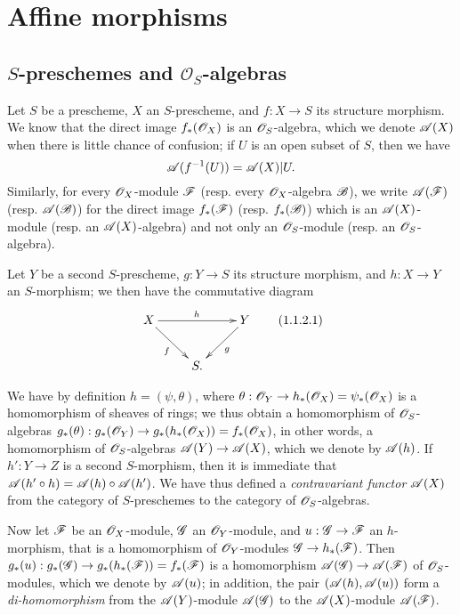 \section{Affine morphisms}
\label{section:II.1}

\subsection{$S$-preschemes and $\mathcal{O}_S$-algebras}
\label{subsection:II.1.1}

\begin{env}[1.1.1]
\label{II.1.1.1}
Let $S$ be a prescheme, $X$ an $S$-prescheme, and $f:X\to S$ its structure morphism.
We know  that the direct image $f_*(\mathscr{O}_X)$ is an $\mathscr{O}_S$-algebra, which we
denote $\mathscr{A}(X)$ when there is little chance of confusion; if $U$ is an open subset of $S$, then we have
\[
  \mathscr{A}(f^{-1}(U))=\mathscr{A}(X)|U.
\]
Similarly, for every $\mathscr{O}_X$-module $\mathscr{F}$ (resp. every $\mathscr{O}_X$-algebra $\mathscr{B}$), we write $\mathscr{A}(\mathscr{F})$ (resp. $\mathscr{A}(\mathscr{B})$) for the direct image $f_*(\mathscr{F})$ (resp. $f_*(\mathscr{B})$) which is an $\mathscr{A}(X)$-module (resp. an $\mathscr{A}(X)$-algebra) and not only an $\mathscr{O}_S$-module (resp. an $\mathscr{O}_S$-algebra).
\end{env}

\begin{env}[1.1.2]
\label{II.1.1.2}
Let $Y$ be a second $S$-prescheme, $g:Y\to S$ its structure morphism, and $h:X\to Y$ an $S$-morphism; we then have the commutative diagram
\[
\label{II.1.1.2.1}
  \xymatrix{
    X\ar[rr]^h\ar[rd]_f & &
    Y\ar[ld]^g\\
    & S.
  }
  \tag{1.1.2.1}
\]

We have by definition $h=(\psi,\theta)$, where $\theta:\sh{O}_Y\to h_*(\sh{O}_X)=\psi_*(\sh{O}_X)$ is a homomorphism of sheaves of rings; we thus obtain  a homomorphism of $\mathscr{O}_S$-algebras $g_*(\theta):g_*(\sh{O}_Y)\to g_*(h_*(\sh{O}_X))=f_*(\sh{O}_X)$, in other words, a homomorphism of $\mathscr{O}_S$-algebras $\sh{A}(Y)\to\sh{A}(X)$, which we denote by $\mathscr{A}(h)$.
If $h':Y\to Z$ is a second $S$-morphism, then it is immediate that $\mathscr{A}(h'\circ h)=\mathscr{A}(h)\circ\mathscr{A}(h')$.
We have thus defined a \emph{contravariant functor $\mathscr{A}(X)$} from the category of $S$-preschemes to the category of $\mathscr{O}_S$-algebras.

Now let $\mathscr{F}$ be an $\mathscr{O}_X$-module, $\mathscr{G}$ an $\mathscr{O}_Y$-module, and $u:\sh{G}\to\sh{F}$ an $h$-morphism, that is  a homomorphism of $\mathscr{O}_Y$-modules $\sh{G}\to h_*(\sh{F})$.
Then $g_*(u):g_*(\sh{G})\to g_*(h_*(\sh{F}))=f_*(\sh{F})$ is a homomorphism $\sh{A}(\sh{G})\to\sh{A}(\sh{F})$ of $\mathscr{O}_S$-modules, which we denote by $\mathscr{A}(u)$; in addition, the pair $(\mathscr{A}(h),\mathscr{A}(u))$ form a \emph{di-homomorphism} from the $\mathscr{A}(Y)$-module $\mathscr{A}(\mathscr{G})$ to the $\mathscr{A}(X)$-module $\mathscr{A}(\mathscr{F})$.
\end{env}

